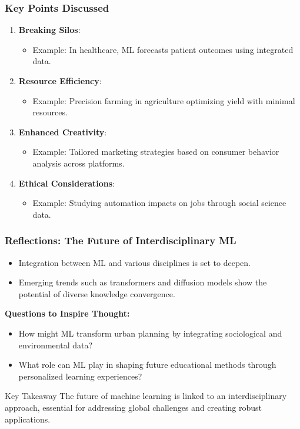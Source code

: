 \documentclass[aspectratio=169]{beamer}
\begin{document}
\begin{frame}[fragile]
    \frametitle{Key Points Discussed}
    
    \begin{enumerate}
        \item \textbf{Breaking Silos}:
            \begin{itemize}
                \item Example: In healthcare, ML forecasts patient outcomes using integrated data.
            \end{itemize}
        \item \textbf{Resource Efficiency}:
            \begin{itemize}
                \item Example: Precision farming in agriculture optimizing yield with minimal resources.
            \end{itemize}
        \item \textbf{Enhanced Creativity}:
            \begin{itemize}
                \item Example: Tailored marketing strategies based on consumer behavior analysis across platforms.
            \end{itemize}
        \item \textbf{Ethical Considerations}:
            \begin{itemize}
                \item Example: Studying automation impacts on jobs through social science data.
            \end{itemize}
    \end{enumerate}
\end{frame}

\begin{frame}[fragile]
    \frametitle{Reflections: The Future of Interdisciplinary ML}
    
    \begin{itemize}
        \item Integration between ML and various disciplines is set to deepen.
        \item Emerging trends such as transformers and diffusion models show the potential of diverse knowledge convergence.
    \end{itemize}
    
    \textbf{Questions to Inspire Thought:}
    \begin{itemize}
        \item How might ML transform urban planning by integrating sociological and environmental data?
        \item What role can ML play in shaping future educational methods through personalized learning experiences?
    \end{itemize}
    
    \begin{block}{Key Takeaway}
        The future of machine learning is linked to an interdisciplinary approach, essential for addressing global challenges and creating robust applications.
    \end{block}
\end{frame}
\end{document}
